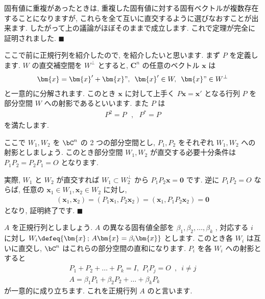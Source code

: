 \documentclass[openany, a4paper, oneside]{jsbook}
\begin{document}
固有値に重複があったときは, 重複した固有値に対する固有ベクトルが複数存在することになりますが,
これらを全て互いに直交するように選びなおすことが出来ます.
したがって上の議論がほぼそのままで成立します.
これで定理が完全に証明されました.  $\blacksquare$

ここで前に正規行列を紹介したので, を紹介したいと思います.
まず $P$ を定義します.
$W$ の直交補空間を $W^{\perp }$ とすると,  $\bm{C}^n$ の任意のベクトル $\bm{x}$ は
\begin{align}
    \bm{x} = \bm{x}' + \bm{x}" , \,\,\, \bm{x}' \in W, \,\,\, \bm{x}" \in W^{\perp}
\end{align}
と一意的に分解されます. このとき $\bm{x}$ に対して上手く $P\bm{x}=\bm{x}'$
となる行列 $P$ を部分空間 $W$ への射影であるといいます. また $P$ は
\begin{align}
    P^2 = P\,\,\,\,,\,\,\,\,P^{*}=P
\end{align}
を満たします.

ここで $W_1,W_2$ を $\bC^n$ の 2 つの部分空間とし,  $P_1,P_2$ をそれぞれ $W_1,W_2$ への
射影としましょう. このとき部分空間 $W_1,W_2$ が直交する必要十分条件は $P_1 P_2 = P_2 P_1 = O$ となります.

実際,  $W_1$ と $W_2$ が直交すれば $W_1 \subset W_2 ^{\perp}$ から $P_1 P_2 \bm{x}= \bm{0}$ です.
逆に $P_1 P_2 = O$ ならば, 任意の $\bm{x}_1 \in W_1,\bm{x}_2 \in W_2$ に対し,
\begin{align}
    (\bm{x}_1,\bm{x}_2) = (P_1 \bm{x}_1,P_2 \bm{x}_2) = (\bm{x}_1,P_1 P_2\bm{x}_2) = \bm{0}
\end{align}
となり, 証明終了です.  $\blacksquare$

$A$ を正規行列としましょう.  $A$ の異なる固有値全部を $\beta _1, \beta _2,\dots,\beta _k$ , 対応する
$i$ に対し $W_i \defeq \{ \bm{x} \, ; \, A\bm{x}=\beta _i \bm{x} \}$ とします.
このとき各 $W_i$ は互いに直交し,  $\bC^n$ はこれらの部分空間の直和になります.
$P_i$ を各 $W_i$ への射影とすると
\begin{gather}
P_1 + P_2 + \dots + P_k = I , \,\, P_i P_j = O \,\,\, , \,\,\,i \not = j \\
A = \beta _1 P_1 + \beta _2 P_2 + \dots + \beta _k P_k
\end{gather}
が一意的に成り立ちます. これを正規行列 $A$ のと言います.
\end{document}
